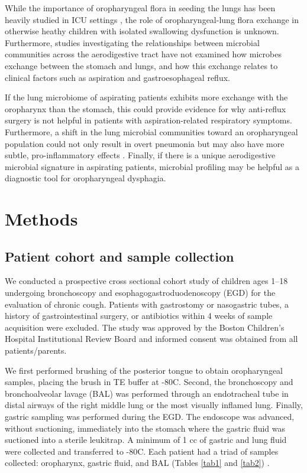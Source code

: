 While the importance of oropharyngeal flora in seeding the lungs has been heavily studied in ICU settings \cite{tantipong2008decontamination,koeman2006decontamination,hu2010pseudo}, the role of oropharyngeal-lung flora exchange in otherwise heathy children with isolated swallowing dysfunction is unknown.
Furthermore, studies investigating the relationships between microbial communities across the aerodigestive tract have not examined how microbes exchange between the stomach and lungs, and how this exchange relates to clinical factors such as aspiration and gastroesophageal reflux.

If the lung microbiome of aspirating patients exhibits more exchange with the oropharynx than the stomach, this could provide evidence for why anti-reflux surgery is not helpful in patients with aspiration-related respiratory symptoms.
Furthermore, a shift in the lung microbial communities toward an oropharyngeal population could not only result in overt pneumonia but may also have more subtle, pro-inflammatory effects \cite{segal-2016-inflammation}.
Finally, if there is a unique aerodigestive microbial signature in aspirating patients, microbial profiling may be helpful as a diagnostic tool for oropharyngeal dysphagia.

\section{Methods}

\subsection{Patient cohort and sample collection}

We conducted a prospective cross sectional cohort study of children ages 1--18 undergoing bronchoscopy and esophagogastroduodenoscopy (EGD) for the evaluation of chronic cough.
Patients with gastrostomy or nasogastric tubes, a history of gastrointestinal surgery, or antibiotics within 4 weeks of sample acquisition were excluded.
The study was approved by the Boston Children's Hospital Institutional Review Board and informed consent was obtained from all patients/parents.

We first performed brushing of the posterior tongue to obtain oropharyngeal samples, placing the brush in TE buffer at -80C.
Second, the bronchoscopy and bronchoalveolar lavage (BAL) was performed through an endotracheal tube in distal airways of the right middle lung or the most visually inflamed lung.
Finally, gastric sampling was performed during the EGD.
The endoscope was advanced, without suctioning, immediately into the stomach where the gastric fluid was suctioned into a sterile leukitrap.
A minimum of 1 cc of gastric and lung fluid were collected and transferred to -80C.
Each patient had a triad of samples collected: oropharynx, gastric fluid, and BAL (Tables \ref{tab1} and \ref{tab2}) \cite{rosen2015ppi}.

